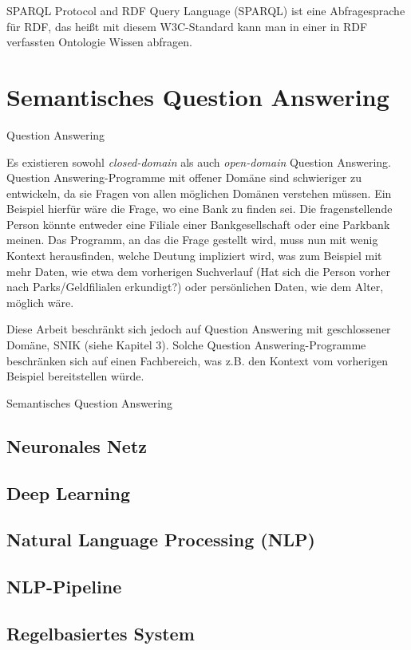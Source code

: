 SPARQL Protocol and RDF Query Language (SPARQL) ist eine Abfragesprache für RDF, das heißt mit diesem W3C-Standard kann man in einer in RDF verfassten Ontologie Wissen abfragen.
\section{Semantisches Question Answering}

\begin{definition}{Question Answering}
\end{definition}

Es existieren sowohl \emph{closed-domain} als auch \emph{open-domain} Question Answering.
Question Answering-Programme mit offener Domäne sind schwieriger zu entwickeln,
da sie Fragen von allen möglichen Domänen verstehen müssen.
Ein Beispiel hierfür wäre die Frage, wo eine Bank zu finden sei.
Die fragenstellende Person könnte entweder eine Filiale einer Bankgesellschaft oder eine Parkbank meinen.
Das Programm, an das die Frage gestellt wird, muss nun mit wenig Kontext herausfinden,
welche Deutung impliziert wird, was zum Beispiel mit mehr Daten,
wie etwa dem vorherigen Suchverlauf (Hat sich die Person vorher nach Parks/Geldfilialen erkundigt?)
oder persönlichen Daten, wie dem Alter, möglich wäre.

Diese Arbeit beschränkt sich jedoch auf Question Answering mit geschlossener Domäne, SNIK (siehe Kapitel 3).
Solche Question Answering-Programme beschränken sich auf einen Fachbereich,
was z.B. den Kontext vom vorherigen Beispiel bereitstellen würde.

\begin{definition}{Semantisches Question Answering}
\end{definition}

\subsection{Neuronales Netz}



\subsection{Deep Learning}



\subsection{Natural Language Processing (NLP)}



\subsection{NLP-Pipeline}



\subsection{Regelbasiertes System}

